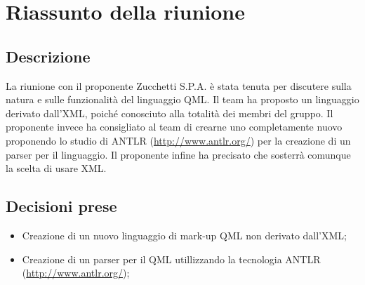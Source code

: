 \section{Riassunto della riunione}
\subsection{Descrizione}

La riunione con il proponente Zucchetti S.P.A. è stata tenuta per discutere sulla natura e sulle funzionalità del linguaggio QML. Il team ha proposto un linguaggio derivato dall'XML, poiché conosciuto alla totalità dei membri del gruppo. Il proponente invece ha consigliato al team di crearne uno completamente nuovo proponendo lo studio di ANTLR (\url{http://www.antlr.org/}) per la creazione di un parser per il linguaggio. Il proponente infine ha precisato che sosterrà comunque la scelta di usare XML.

\subsection{Decisioni prese}
\begin{itemize}
	\item Creazione di un nuovo linguaggio di mark-up QML non derivato dall'XML;
	\item Creazione di un parser per il QML utillizzando la tecnologia ANTLR (\url{http://www.antlr.org/});
\end{itemize}

